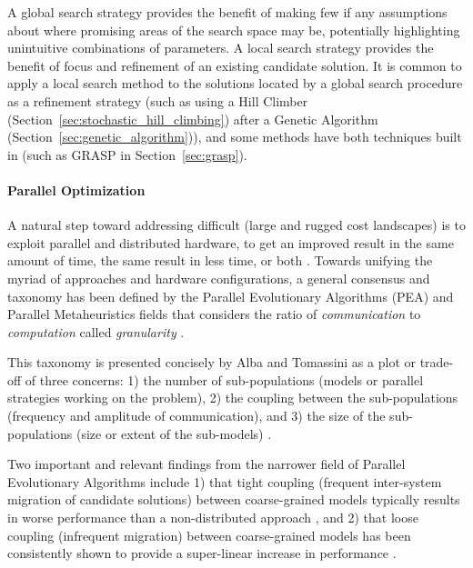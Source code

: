 A global search strategy provides the benefit of making few if any assumptions about where promising areas of the search space may be, potentially highlighting unintuitive combinations of parameters. A local search strategy provides the benefit of focus and refinement of an existing candidate solution. It is common to apply a local search method to the solutions located by a global search procedure as a refinement strategy (such as using a Hill Climber (Section~\ref{sec:stochastic_hill_climbing}) after a Genetic Algorithm (Section~\ref{sec:genetic_algorithm})), and some methods have both techniques built in (such as GRASP in Section~\ref{sec:grasp}).
	
\paragraph{Parallel Optimization}
A natural step toward addressing difficult (large and rugged cost landscapes) is to exploit parallel and distributed hardware, to get an improved result in the same amount of time, the same result in less time, or both \cite{Crainic2005}. Towards unifying the myriad of approaches and hardware configurations, a general consensus and taxonomy has been defined by the Parallel Evolutionary Algorithms (PEA) and Parallel Metaheuristics fields that considers the ratio of \emph{communication} to \emph{computation} called \emph{granularity} \cite{Cantu-Paz2000, Alba2005a}. 

This taxonomy is presented concisely by Alba and Tomassini as a plot or trade-off of three concerns: 1) the number of sub-populations (models or parallel strategies working on the problem), 2) the coupling between the sub-populations (frequency and amplitude of communication), and 3) the size of the sub-populations (size or extent of the sub-models) \cite{Alba2002}. 

Two important and relevant findings from the narrower field of Parallel Evolutionary Algorithms include 1) that tight coupling (frequent inter-system migration of candidate solutions) between coarse-grained models typically results in worse performance than a non-distributed approach \cite{Alba2000}, and 2) that loose coupling (infrequent migration) between coarse-grained models has been consistently shown to provide a super-linear increase in performance \cite{Alba2002a, Belding1995, Cantu-Paz2000}.
	
